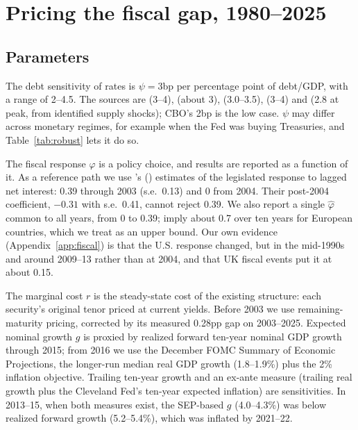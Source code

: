 \section{Pricing the fiscal gap, 1980--2025}\label{sec:pricing}

\subsection{Parameters}\label{sec:parameters}

The debt sensitivity of rates is $\psi=3$bp per percentage point of debt/GDP, with a range of 2--4.5. The sources are \citet{laubach2009} (3--4), \citet{engen2005} (about 3), \citet{plante2025} (3.0--3.5), \citet{bhatt2026} (3--4) and \citet{bi2026} (2.8 at peak, from identified supply shocks); CBO's 2bp \citep{neveu2024} is the low case. $\psi$ may differ across monetary regimes, for example when the Fed was buying Treasuries, and Table~\ref{tab:robust} lets it do so.

The fiscal response $\hat\varphi$ is a policy choice, and results are reported as a function of it. As a reference path we use \citeauthor{auerbach2024}'s (\citeyear{auerbach2024}) estimates of the legislated response to lagged net interest: 0.39 through 2003 (s.e.\ 0.13) and 0 from 2004. Their post-2004 coefficient, $-0.31$ with s.e.\ 0.41, cannot reject 0.39. We also report a single $\hat\varphi$ common to all years, from 0 to 0.39; \citet{degroot2015} imply about 0.7 over ten years for European countries, which we treat as an upper bound. Our own evidence (Appendix~\ref{app:fiscal}) is that the U.S. response changed, but in the mid-1990s and around 2009--13 rather than at 2004, and that UK fiscal events put it at about 0.15.

The marginal cost $r$ is the steady-state cost of the existing structure: each security's original tenor priced at current yields. Before 2003 we use remaining-maturity pricing, corrected by its measured 0.28pp gap on 2003--2025. Expected nominal growth $g$ is proxied by realized forward ten-year nominal GDP growth through 2015; from 2016 we use the December FOMC Summary of Economic Projections, the longer-run median real GDP growth (1.8--1.9\%) plus the 2\% inflation objective. Trailing ten-year growth and an ex-ante measure (trailing real growth plus the Cleveland Fed's ten-year expected inflation) are sensitivities. In 2013--15, when both measures exist, the SEP-based $g$ (4.0--4.3\%) was below realized forward growth (5.2--5.4\%), which was inflated by 2021--22.

